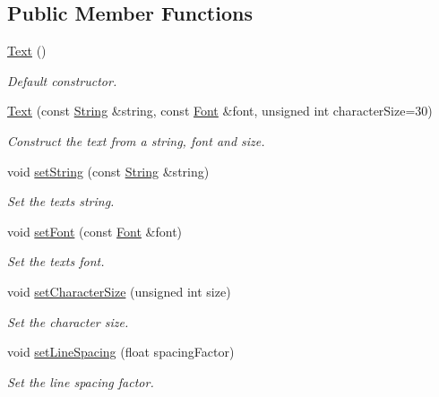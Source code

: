 \subsection*{Public Member Functions}
\begin{DoxyCompactItemize}
\item 
\mbox{\hyperlink{classsf_1_1_text_aff7cab6a92e5948c9d1481cb2d87eb84}{Text}} ()
\begin{DoxyCompactList}\small\item\em Default constructor. \end{DoxyCompactList}\item 
\mbox{\hyperlink{classsf_1_1_text_a614019e0b5c0ed39a99d32483a51f2c5}{Text}} (const \mbox{\hyperlink{classsf_1_1_string}{String}} \&string, const \mbox{\hyperlink{classsf_1_1_font}{Font}} \&font, unsigned int character\+Size=30)
\begin{DoxyCompactList}\small\item\em Construct the text from a string, font and size. \end{DoxyCompactList}\item 
void \mbox{\hyperlink{classsf_1_1_text_a7d3b3359f286fd9503d1ced25b7b6c33}{set\+String}} (const \mbox{\hyperlink{classsf_1_1_string}{String}} \&string)
\begin{DoxyCompactList}\small\item\em Set the text\textquotesingle{}s string. \end{DoxyCompactList}\item 
void \mbox{\hyperlink{classsf_1_1_text_a2927805d1ae92d57f15034ea34756b81}{set\+Font}} (const \mbox{\hyperlink{classsf_1_1_font}{Font}} \&font)
\begin{DoxyCompactList}\small\item\em Set the text\textquotesingle{}s font. \end{DoxyCompactList}\item 
void \mbox{\hyperlink{classsf_1_1_text_ae96f835fc1bff858f8a23c5b01eaaf7e}{set\+Character\+Size}} (unsigned int size)
\begin{DoxyCompactList}\small\item\em Set the character size. \end{DoxyCompactList}\item 
void \mbox{\hyperlink{classsf_1_1_text_af6505688f79e2e2d90bd68f4d767e965}{set\+Line\+Spacing}} (float spacing\+Factor)
\begin{DoxyCompactList}\small\item\em Set the line spacing factor. \end{DoxyCompactList}\item 

\end{DoxyCompactItemize}
